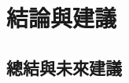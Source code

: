 \chapter{結論與建議}
\label{c:conclusion}
\section{總結與未來建議}


\begin{comment}
\section{實驗結果討論}

空白

\subsection{綜合討論}

空白


\section{其他實驗結果討論}





\section{總結與未來建議}

\section{研究限制}
\end{comment}
